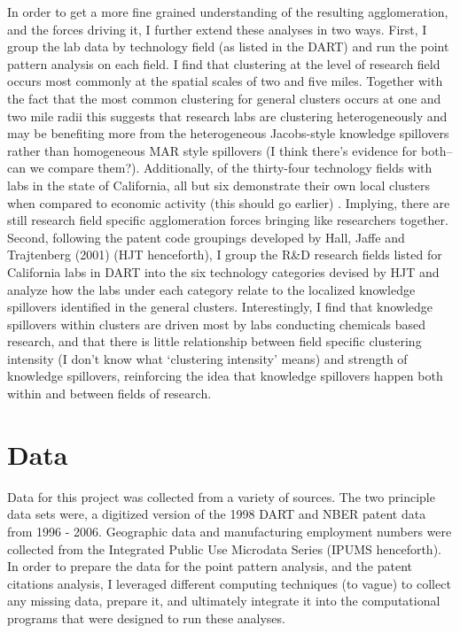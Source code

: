 \documentclass[12pt,letterpaper]{article}
\begin{document}
\par 
In order to get a more fine grained understanding of the resulting agglomeration, and the forces driving it, I further extend these analyses in two ways. First, I group the lab data by technology field (as listed in the DART) and run the point pattern analysis on each field. I find that clustering at the level of research field occurs most commonly at the spatial scales of two and five miles. Together with the fact that the most common clustering for general clusters occurs at one and two mile radii this suggests that research labs are clustering heterogeneously and may be benefiting more from the heterogeneous Jacobs-style knowledge spillovers rather than homogeneous MAR style spillovers {\color{blue}(I think there's evidence for both--can we compare them?)}. Additionally, of the thirty-four technology fields with labs in the state of California, all but six demonstrate their own local clusters when compared to economic activity {\color{red}(this should go earlier)} . Implying, there are still research field specific agglomeration forces bringing like researchers together. Second, following the patent code groupings developed by Hall, Jaffe and Trajtenberg (2001) (HJT henceforth), I group the R\&D research fields listed for California labs in DART into the six technology categories devised by HJT and analyze how the labs under each category relate to the localized knowledge spillovers identified in the general clusters. Interestingly, I find that knowledge spillovers within clusters are driven most by labs conducting chemicals based research, and that there is little relationship between field specific clustering intensity {\color{red}(I don't know what `clustering intensity' means)}  and strength of knowledge spillovers, reinforcing the idea that knowledge spillovers happen both within and between fields of research.
 
\section{Data}
Data for this project was collected from a variety of sources. The two principle data sets were, a digitized version of the 1998 DART and NBER patent data from 1996 - 2006. Geographic data and manufacturing employment numbers were collected from the Integrated Public Use Microdata Series (IPUMS henceforth). In order to prepare the data for the point pattern analysis, and the patent citations analysis, I leveraged different computing techniques {\color{red}(to vague)} to collect any missing data, prepare it, and ultimately integrate it into the computational programs that were designed to run these analyses. 
\end{document}
